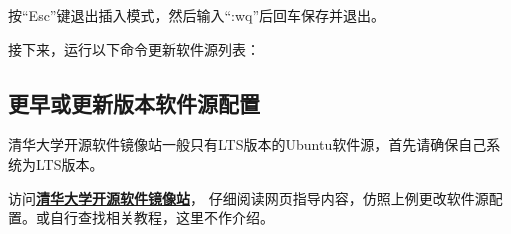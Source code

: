 按“Esc”键退出插入模式，然后输入“:wq”后回车保存并退出。

接下来，运行以下命令更新软件源列表：

\subsection{更早或更新版本软件源配置}

清华大学开源软件镜像站一般只有LTS版本的Ubuntu软件源，首先请确保自己系统为LTS版本。

访问\textbf{\textcolor{blue}{\href{https://mirrors.tuna.tsinghua.edu.cn/help/ubuntu/}{清华大学开源软件镜像站}}}，
仔细阅读网页指导内容，仿照上例更改软件源配置。或自行查找相关教程，这里不作介绍。

